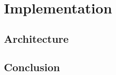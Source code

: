 \documentclass[a4paper, 11pt, oneside]{elsarticle}
\begin{document}
\section{Implementation}

\subsection{Architecture}

\subsection{Conclusion}



\newpage



\end{document}
